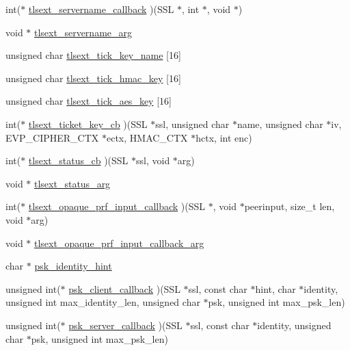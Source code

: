 \begin{DoxyCompactItemize}
\item 
int($\ast$ \hyperlink{structssl__ctx__st_aab0b46fe325bc9d023fc3eec4c29adf3}{tlsext\-\_\-servername\-\_\-callback} )(S\-S\-L $\ast$, int $\ast$, void $\ast$)
\item 
void $\ast$ \hyperlink{structssl__ctx__st_a2ab57baeccaab0b8d7ecc9c478f3ee14}{tlsext\-\_\-servername\-\_\-arg}
\item 
unsigned char \hyperlink{structssl__ctx__st_a7f5cf468448dbbe1ae706c152d4abee5}{tlsext\-\_\-tick\-\_\-key\-\_\-name} \mbox{[}16\mbox{]}
\item 
unsigned char \hyperlink{structssl__ctx__st_a3bbed4399466da935affa8b11dc37967}{tlsext\-\_\-tick\-\_\-hmac\-\_\-key} \mbox{[}16\mbox{]}
\item 
unsigned char \hyperlink{structssl__ctx__st_ad6776ce4d46e74ca3580f34365c53b41}{tlsext\-\_\-tick\-\_\-aes\-\_\-key} \mbox{[}16\mbox{]}
\item 
int($\ast$ \hyperlink{structssl__ctx__st_a6eb60b719dcca531324468c441147e61}{tlsext\-\_\-ticket\-\_\-key\-\_\-cb} )(S\-S\-L $\ast$ssl, unsigned char $\ast$name, unsigned char $\ast$iv, E\-V\-P\-\_\-\-C\-I\-P\-H\-E\-R\-\_\-\-C\-T\-X $\ast$ectx, H\-M\-A\-C\-\_\-\-C\-T\-X $\ast$hctx, int enc)
\item 
int($\ast$ \hyperlink{structssl__ctx__st_aa4c9b99b51d363cafc0d6f22c34d64eb}{tlsext\-\_\-status\-\_\-cb} )(S\-S\-L $\ast$ssl, void $\ast$arg)
\item 
void $\ast$ \hyperlink{structssl__ctx__st_a34c025b8e62d9ade63d51808d9271192}{tlsext\-\_\-status\-\_\-arg}
\item 
int($\ast$ \hyperlink{structssl__ctx__st_a91ee92c633d30067bad36f1d4458883f}{tlsext\-\_\-opaque\-\_\-prf\-\_\-input\-\_\-callback} )(S\-S\-L $\ast$, void $\ast$peerinput, size\-\_\-t len, void $\ast$arg)
\item 
void $\ast$ \hyperlink{structssl__ctx__st_a256ac8f414a4bbf80a5ee4ca1f2df89c}{tlsext\-\_\-opaque\-\_\-prf\-\_\-input\-\_\-callback\-\_\-arg}
\item 
char $\ast$ \hyperlink{structssl__ctx__st_a8834b3e8d91529f7339f8648d20a884b}{psk\-\_\-identity\-\_\-hint}
\item 
unsigned int($\ast$ \hyperlink{structssl__ctx__st_a00d596286421b49966ee80ef715dd21d}{psk\-\_\-client\-\_\-callback} )(S\-S\-L $\ast$ssl, const char $\ast$hint, char $\ast$identity, unsigned int max\-\_\-identity\-\_\-len, unsigned char $\ast$psk, unsigned int max\-\_\-psk\-\_\-len)
\item 
unsigned int($\ast$ \hyperlink{structssl__ctx__st_ac6e3c5a91b3fd81cf675ca61b091ebac}{psk\-\_\-server\-\_\-callback} )(S\-S\-L $\ast$ssl, const char $\ast$identity, unsigned char $\ast$psk, unsigned int max\-\_\-psk\-\_\-len)

\end{DoxyCompactItemize}
